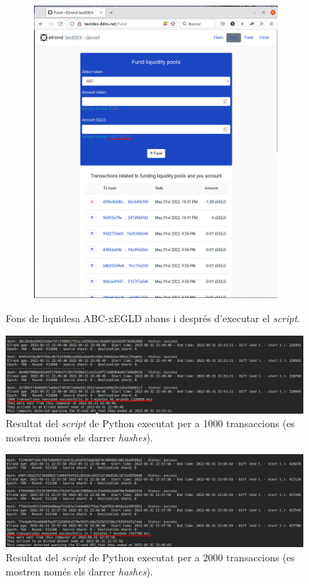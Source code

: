 \documentclass[11pt,a4paper]{article}
\begin{document}
\begin{figure}[!htb]
\begin{subfigure}[b]{0.47\textwidth}
	  \includegraphics[width=\linewidth]{send1000trans2.png}
	\end{subfigure}\hfill
	\caption{Fons de liquidesa ABC-xEGLD abans i després d'executar el \textit{script}.}\label{fig:send1000trans}
\end{figure}

\begin{figure}[h]
\includegraphics[width=0.99\textwidth]{send1000trans3.png}
\centering
\caption{Resultat del \textit{script} de Python executat per a 1000 transaccions (es mostren només els darrer \textit{hashes}).}\label{fig:send1000trans3}
\end{figure} 

\begin{figure}[h]
\includegraphics[width=0.99\textwidth]{send2000trans1.png}
\centering
\caption{Resultat del \textit{script} de Python executat per a 2000 transaccions (es mostren només els darrer \textit{hashes}).}\label{fig:send2000trans1}
\end{figure} 
\end{document}
